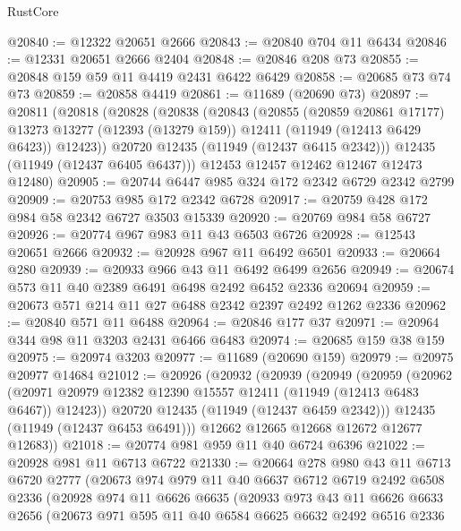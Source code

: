 \begin{lexlean}{RustCore}
\begin{coremodule}
@20840 := @12322 @20651 @2666
@20843 := @20840 @704 @11 @6434
@20846 := @12331 @20651 @2666 @2404
@20848 := @20846 @208 @73
@20855 := @20848 @159 @59 @11 @4419 @2431 @6422 @6429
@20858 := @20685 @73 @74 @73
@20859 := @20858 @4419
@20861 := @11689 (@20690 @73)
@20897 := @20811
    (@20818
      (@20828
        (@20838
          (@20843
            (@20855
              (@20859 @20861 @17177)
              @13273
              @13277
              (@12393 (@13279 @159))
              @12411
              (@11949 (@12413 @6429 @6423))
              @12423))
          @20720
          @12435
          (@11949 (@12437 @6415 @2342)))
        @12435
        (@11949 (@12437 @6405 @6437)))
      @12453
      @12457
      @12462
      @12467
      @12473
      @12480)
@20905 := @20744 @6447 @985 @324 @172 @2342 @6729 @2342 @2799
@20909 := @20753 @985 @172 @2342 @6728
@20917 := @20759 @428 @172 @984 @58 @2342 @6727 @3503 @15339
@20920 := @20769 @984 @58 @6727
@20926 := @20774 @967 @983 @11 @43 @6503 @6726
@20928 := @12543 @20651 @2666
@20932 := @20928 @967 @11 @6492 @6501
@20933 := @20664 @280
@20939 := @20933 @966 @43 @11 @6492 @6499 @2656
@20949 := @20674 @573 @11 @40 @2389 @6491 @6498 @2492 @6452 @2336 @20694
@20959 := @20673 @571 @214 @11 @27 @6488 @2342 @2397 @2492 @1262 @2336
@20962 := @20840 @571 @11 @6488
@20964 := @20846 @177 @37
@20971 := @20964 @344 @98 @11 @3203 @2431 @6466 @6483
@20974 := @20685 @159 @38 @159
@20975 := @20974 @3203
@20977 := @11689 (@20690 @159)
@20979 := @20975 @20977 @14684
@21012 := @20926
    (@20932
      (@20939
        (@20949
          (@20959
            (@20962
              (@20971 @20979 @12382 @12390 @15557 @12411 (@11949 (@12413 @6483 @6467)) @12423))
            @20720
            @12435
            (@11949 (@12437 @6459 @2342)))
          @12435
          (@11949 (@12437 @6453 @6491)))
        @12662
        @12665
        @12668
        @12672
        @12677
        @12683))
@21018 := @20774 @981 @959 @11 @40 @6724 @6396
@21022 := @20928 @981 @11 @6713 @6722
@21330 := @20664
    @278
    @980
    @43
    @11
    @6713
    @6720
    @2777
    (@20673
      @974
      @979
      @11
      @40
      @6637
      @6712
      @6719
      @2492
      @6508
      @2336
      (@20928
        @974
        @11
        @6626
        @6635
        (@20933
          @973
          @43
          @11
          @6626
          @6633
          @2656
          (@20673
            @971
            @595
            @11
            @40
            @6584
            @6625
            @6632
            @2492
            @6516
            @2336

\end{coremodule}
\end{lexlean}
